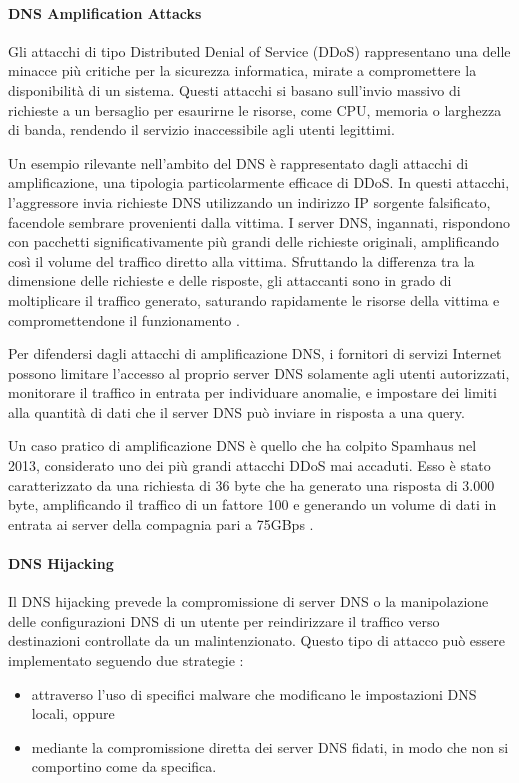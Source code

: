 \paragraph{DNS Amplification Attacks}
Gli attacchi di tipo Distributed Denial of Service (DDoS) rappresentano una delle minacce più critiche per la sicurezza informatica, mirate a compromettere la disponibilità di un sistema. Questi attacchi si basano sull'invio massivo di richieste a un bersaglio per esaurirne le risorse, come CPU, memoria o larghezza di banda, rendendo il servizio inaccessibile agli utenti legittimi.

Un esempio rilevante nell'ambito del DNS è rappresentato dagli attacchi di amplificazione, una tipologia particolarmente efficace di DDoS. In questi attacchi, l'aggressore invia richieste DNS utilizzando un indirizzo IP sorgente falsificato, facendole sembrare provenienti dalla vittima. I server DNS, ingannati, rispondono con pacchetti significativamente più grandi delle richieste originali, amplificando così il volume del traffico diretto alla vittima. Sfruttando la differenza tra la dimensione delle richieste e delle risposte, gli attaccanti sono in grado di moltiplicare il traffico generato, saturando rapidamente le risorse della vittima e compromettendone il funzionamento \cite{DBLP:conf/ictc/AlieyanKARA16}.

Per difendersi dagli attacchi di amplificazione DNS, i fornitori di servizi Internet possono limitare l'accesso al proprio server DNS solamente agli utenti autorizzati, monitorare il traffico in entrata per individuare anomalie, e impostare dei limiti alla quantità di dati che il server DNS può inviare in risposta a una query.

Un caso pratico di amplificazione DNS è quello che ha colpito Spamhaus nel 2013, considerato uno dei più grandi attacchi DDoS mai accaduti. Esso è stato caratterizzato da una richiesta di 36 byte che ha generato una risposta di 3.000 byte, amplificando il traffico di un fattore 100 e generando un volume di dati in entrata ai server della compagnia pari a 75GBps \cite{Bonasera2021}.

\paragraph{DNS Hijacking}
Il DNS hijacking prevede la compromissione di server DNS o la manipolazione delle configurazioni DNS di un utente per reindirizzare il traffico verso destinazioni controllate da un malintenzionato. Questo tipo di attacco può essere implementato seguendo due strategie \cite{hudaib2014dns}:
\begin{itemize}
  \item attraverso l'uso di specifici malware che modificano le impostazioni DNS locali, oppure
  \item mediante la compromissione diretta dei server DNS fidati, in modo che non si comportino come da specifica.
\end{itemize}


